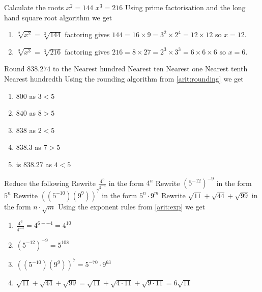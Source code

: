 \begin{ExerciseList}
\Exercise Calculate the roots 
\Question $x^2 = 144$
\Question $x^3 = 216$
\Answer Using prime factorisation and the long hand square root algorithm we get
\begin{enumerate}
\item\myindent $\sqrt[2]{x^2} = \sqrt[2]{144}$ factoring gives $144 = 16 \times 9 = 3^2 \times 2^4 = 12 \times 12$ so $x = 12$.
\item\myindent $\sqrt[3]{x^3} = \sqrt[3]{216}$ factoring gives $216 = 8 \times 27 = 2^3 \times 3^3 = 6 \times 6 \times 6$ so $x = 6$.
\end{enumerate}

\Exercise Round $838.274$ to the
\Question Nearest hundred
\Question Nearest ten 
\Question Nearest one
\Question Nearest tenth
\Question Nearest hundredth
\Answer Using the rounding algorithm from \ref{arit:rounding} we get
\begin{enumerate}
\item\myindent $800$ as $3 < 5$
\item\myindent $840$ as $8 > 5$
\item\myindent $838$ as $2 < 5$
\item\myindent $838.3$ as $7 > 5$
\item\myindent is $838.27$ as $4 < 5$
\end{enumerate}

\Exercise Reduce the following
\Question Rewrite $\frac{4^6}{4^{-4}}$ in the form $4^n$
\Question Rewrite $(5^{-12})^{-9}$ in the form $5^n$
\Question Rewrite $((5^{-10})(9^9))^7$ in the form $5^n \cdot 9^m$
\Question Rewrite $\sqrt{11} + \sqrt{44} + \sqrt{99}$ in the form $n \cdot \sqrt{m}$
\Answer Using the exponent rules from \ref{arit:exp} we get
\begin{enumerate}
\item\myindent $\frac{4^6}{4^{-4}} = 4^{6 - -4} = 4^{10}$
\item\myindent $(5^{-12})^{-9} = 5^{108}$
\item\myindent $((5^{-10})(9^9))^7 = 5^{-70} \cdot 9^{63}$
\item\myindent $\sqrt{11} + \sqrt{44} + \sqrt{99} =
                \sqrt{11} + \sqrt{4 \cdot 11} + \sqrt{9 \cdot 11} = 6\sqrt{11}$
\end{enumerate}
\end{ExerciseList}
